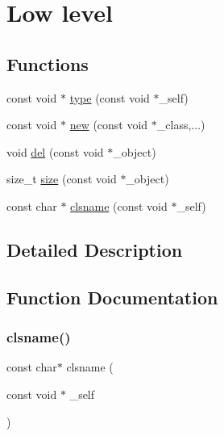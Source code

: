 \hypertarget{group__low}{}\section{Low level}
\label{group__low}
\subsection*{Functions}
\begin{DoxyCompactItemize}
\item 
const void $\ast$ \mbox{\hyperlink{group__low_ga504cef7fd39aff50e8e27f4f74568753}{type}} (const void $\ast$\+\_\+self)
\item 
const void $\ast$ \mbox{\hyperlink{group__low_gaa356efc2c9e72711bf56b41a4f7b125f}{new}} (const void $\ast$\+\_\+class,...)
\item 
void \mbox{\hyperlink{group__low_gae293fe2fbbf9f2e8a87c1141e7412814}{del}} (const void $\ast$\+\_\+object)
\item 
size\+\_\+t \mbox{\hyperlink{group__low_gafac8564ed88a6f8585f043fc6b2fa7e1}{size}} (const void $\ast$\+\_\+object)
\item 
const char $\ast$ \mbox{\hyperlink{group__low_gadcc35aece3f8a4c822a9bf2a591f087b}{clsname}} (const void $\ast$\+\_\+self)
\end{DoxyCompactItemize}


\subsection{Detailed Description}


\subsection{Function Documentation}
\mbox{\label{group__low_gadcc35aece3f8a4c822a9bf2a591f087b}} 
\subsubsection{\texorpdfstring{clsname()}{clsname()}}
{\footnotesize\ttfamily const char$\ast$ clsname (\begin{DoxyParamCaption}\item[{const void $\ast$}]{\+\_\+self }\end{DoxyParamCaption})}



